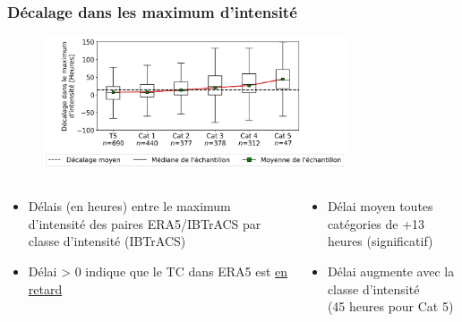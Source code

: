 \documentclass[aspectratio=169, usepdftitle=false, xcolor={dvipsnames}, 9pt,table]{beamer}
\begin{document}
\begin{frame}[t]
    \frametitle{Décalage dans les maximum d'intensité}
    \begin{figure}
        \centering
        \includegraphics[width=0.8\textwidth]{Figures/lag_max_intensity_myVTU.png}
    \end{figure}
    \begin{columns}
        \footnotesize
        \setlength{\leftmargini}{3ex}
        \begin{column}{0.5\textwidth}
            \begin{examples}
                \begin{itemize}
                    \item Délais (en heures) entre le maximum d'intensité des paires ERA5/IBTrACS par classe d'intensité (IBTrACS)
                    \item Délai > 0 indique que le TC dans ERA5 est \underline{en retard}
                \end{itemize}
            \end{examples}
        \end{column}
        \begin{column}{0.5\textwidth}
            \begin{block} 
                \begin{itemize}
                    \item Délai moyen toutes catégories de \alert{+13 heures} (significatif)
                    \item Délai \alert{augmente} avec la classe d'intensité\\(45 heures pour Cat 5)
                \end{itemize}
            \end{block}
        \end{column}
    \end{columns}
\end{frame}
\end{document}
